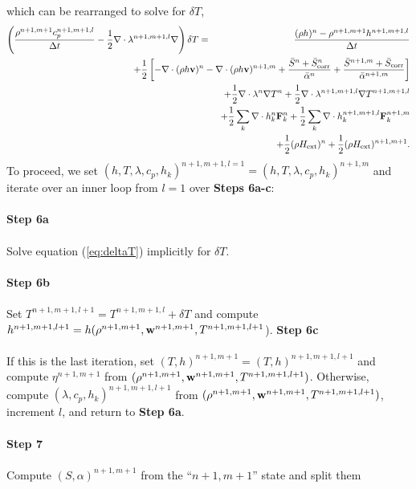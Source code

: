 \documentclass[final]{siamltex}
\def\Fb {{\bf F}}
\def\vb {{\bf v}}
\def\wb {{\bf w}}
\def\Hext {H_{\rm ext}}
\def\half   {\frac{1}{2}}
\begin{document}
which can be rearranged to solve for $\delta T$,
\begin{eqnarray}
\left(\frac{\rho^{n+1,m+1}c_p^{n+1,m+1,l}}{\Delta t} - \half\nabla\cdot\lambda^{n+1,m+1,l}\nabla\right)\delta T &=& \frac{(\rho h)^n - \rho^{n+1,m+1}h^{n+1,m+1,l}}{\Delta t}\nonumber\\
&&\hspace{-1.25in} + \half\left[-\nabla\cdot(\rho h\vb)^n - \nabla\cdot(\rho h\vb)^{n+1,m} + \frac{\bar{S}^n + \bar{S}_{\rm corr}^n}{\bar{\alpha}^n} + \frac{\bar{S}^{n+1,m} + \bar{S}_{\rm corr}}{\bar{\alpha}^{n+1,m}}\right]\nonumber\\
&&\hspace{-1.25in} + \half\nabla\cdot\lambda^n\nabla T^n + \half\nabla\cdot\lambda^{n+1,m+1,l}\nabla T^{n+1,m+1,l}\nonumber\\
&&\hspace{-1.25in} + \half\sum_k\nabla\cdot h_k^n \Fb_k^n + \half\sum_k\nabla\cdot h_k^{n+1,m+1,l} \Fb_k^{n+1,m}\nonumber\\
&&\hspace{-1.25in} + \half(\rho\Hext)^n + \half(\rho\Hext)^{n+1,m+1}.\label{eq:deltaT}
\end{eqnarray}
To proceed, we set $(h,T,\lambda,c_p,h_k)^{n+1,m+1,l=1} = (h,T,\lambda,c_p,h_k)^{n+1,m}$
and iterate over an inner loop from $l=1$ over {\bf Steps 6a-c}:\\ \\
{\bf Step 6a}\\ \\
Solve equation (\ref{eq:deltaT}) implicitly for $\delta T$.\\ \\
{\bf Step 6b}\\ \\
Set $T^{n+1,m+1,l+1} = T^{n+1,m+1,l} + \delta T$ and compute 
$h^{n+1,m+1,l+1} = h(\rho^{n+1,m+1},\wb^{n+1,m+1},T^{n+1,m+1,l+1}$).
{\bf Step 6c}\\ \\
If this is the last iteration, set $(T,h)^{n+1,m+1} = (T,h)^{n+1,m+1,l+1}$
and compute $\eta^{n+1,m+1}$ from $(\rho^{n+1,m+1},\wb^{n+1,m+1},T^{n+1,m+1,l+1})$.
Otherwise,
compute $(\lambda,c_p,h_k)^{n+1,m+1,l+1}$ from 
$(\rho^{n+1,m+1},\wb^{n+1,m+1},T^{n+1,m+1,l+1})$,
increment $l$, and return to {\bf Step 6a}.\\ \\
{\bf Step 7}\\ \\
Compute $(S,\alpha)^{n+1,m+1}$ from the ``$n+1,m+1$'' state and split them 
\end{document}
